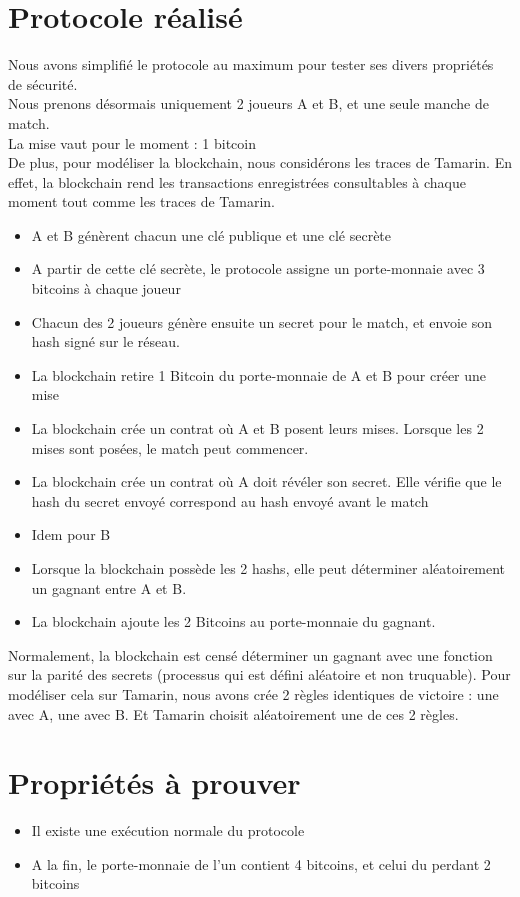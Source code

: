 \documentclass{article}
\begin{document}
\section{Protocole réalisé}
Nous avons simplifié le protocole au maximum pour tester ses divers propriétés de sécurité. \\
Nous prenons désormais uniquement 2 joueurs A et B, et une seule manche de match. \\
La mise vaut pour le moment : 1 bitcoin \\
De plus, pour modéliser la blockchain, nous considérons les traces de Tamarin. En effet, la blockchain rend les transactions enregistrées consultables à chaque moment tout comme les traces de Tamarin.


\begin{itemize}
    \item A et B génèrent chacun une clé publique et une clé secrète
    \item A partir de cette clé secrète, le protocole assigne un porte-monnaie avec 3 bitcoins à chaque joueur
    \item Chacun des 2 joueurs génère ensuite un secret pour le match, et envoie son hash signé sur le réseau.
    \item La blockchain retire 1 Bitcoin du porte-monnaie de A et B pour créer une mise
    \item La blockchain crée un contrat où A et B posent leurs mises. Lorsque les 2 mises sont posées, le match peut commencer.
    \item La blockchain crée un contrat où A doit révéler son secret. Elle vérifie que le hash du secret envoyé correspond au hash envoyé avant le match
    \item Idem pour B
    \item Lorsque la blockchain possède les 2 hashs, elle peut déterminer aléatoirement un gagnant entre A et B.
    \item La blockchain ajoute les 2 Bitcoins au porte-monnaie du gagnant.
\end{itemize}

Normalement, la blockchain est censé déterminer un gagnant avec une fonction sur la parité des secrets (processus qui est défini aléatoire et non truquable). Pour modéliser cela sur Tamarin, nous avons crée 2 règles identiques de victoire : une avec A, une avec B. Et Tamarin choisit aléatoirement une de ces 2 règles.

\section{Propriétés à prouver}
\begin{itemize}
    \item Il existe une exécution normale du protocole
    \item A la fin, le porte-monnaie de l'un contient 4 bitcoins, et celui du perdant 2 bitcoins
    
\end{itemize}
\end{document}
